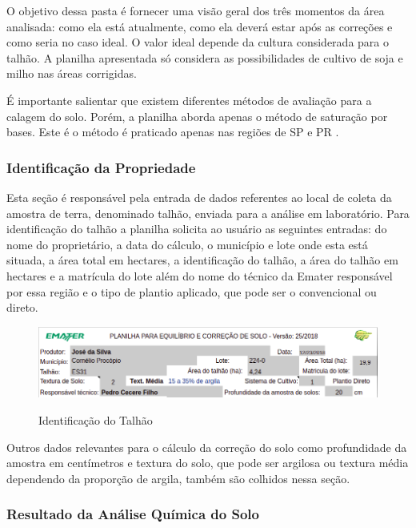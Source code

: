 O objetivo dessa pasta é fornecer uma visão geral dos três momentos da área analisada: como ela está atualmente, como ela deverá estar após as correções e como seria no caso ideal. O valor ideal depende da cultura considerada para o talhão. A planilha apresentada só considera as possibilidades de cultivo de soja e milho nas áreas corrigidas.

É importante salientar que existem diferentes métodos de avaliação para a calagem do solo. Porém, a planilha aborda apenas o método de saturação por bases. Este é o método é praticado apenas nas regiões de SP e PR \cite{rossetto}.

\subsubsection{Identificação da Propriedade}
\label{subsubsec:identificacao}
Esta seção é responsável pela entrada de dados referentes ao local de coleta da amostra de terra, denominado talhão, enviada para a análise em laboratório. Para identificação do talhão a planilha solicita ao usuário as seguintes entradas: do nome do proprietário, a data do cálculo, o município e lote onde esta está situada, a área total em hectares, a identificação do talhão, a área do talhão em hectares e a matrícula do lote além do nome do técnico da Emater responsável por essa região e o tipo de plantio aplicado, que pode ser o convencional ou direto.

\begin{figure}[H]
    \centering
    \caption{Identificação do Talhão}
    \includegraphics[width=13cm]{dados/figuras/planilha/corr_info_propriedade.png}
    \label{fig:identificacaotalhao}
\end{figure}

Outros dados relevantes para o cálculo da correção do solo como profundidade da amostra em centímetros e textura do solo, que pode ser argilosa ou textura média dependendo da proporção de argila, também são colhidos nessa seção.

\subsubsection{Resultado da Análise Química do Solo}
\label{subsubsec:analisequimica}


